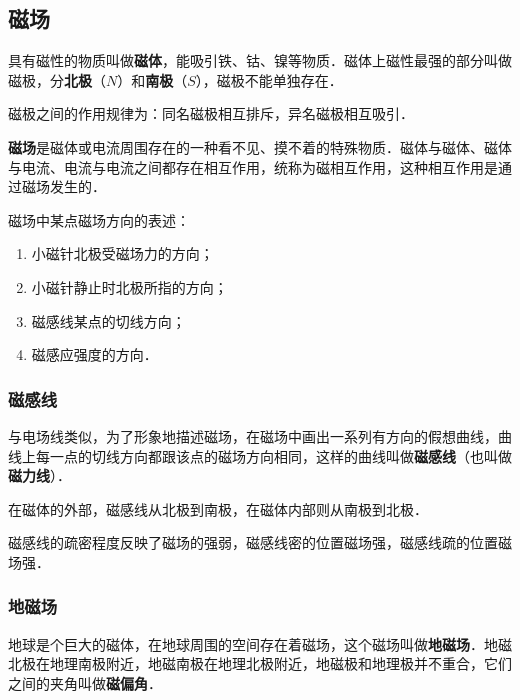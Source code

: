 
\begin{issues}
\issueDraft
\issueTODO
\end{issues}
\subsection{磁场}

具有磁性的物质叫做\textbf{磁体}，能吸引铁、钴、镍等物质．磁体上磁性最强的部分叫做磁极，分\textbf{北极}（$N$）和\textbf{南极}（$S$），磁极不能单独存在．

磁极之间的作用规律为：同名磁极相互排斥，异名磁极相互吸引．

\textbf{磁场}是磁体或电流周围存在的一种看不见、摸不着的特殊物质．磁体与磁体、磁体与电流、电流与电流之间都存在相互作用，统称为磁相互作用，这种相互作用是通过磁场发生的．

磁场中某点磁场方向的表述：

\begin{enumerate}
\item 小磁针北极受磁场力的方向；
\item 小磁针静止时北极所指的方向；
\item 磁感线某点的切线方向；
\item 磁感应强度的方向．
\end{enumerate}

\subsubsection{磁感线}
与电场线类似，为了形象地描述磁场，在磁场中画出一系列有方向的假想曲线，曲线上每一点的切线方向都跟该点的磁场方向相同，这样的曲线叫做\textbf{磁感线}（也叫做\textbf{磁力线}）．

在磁体的外部，磁感线从北极到南极，在磁体内部则从南极到北极．

磁感线的疏密程度反映了磁场的强弱，磁感线密的位置磁场强，磁感线疏的位置磁场强．

\subsubsection{地磁场}

地球是个巨大的磁体，在地球周围的空间存在着磁场，这个磁场叫做\textbf{地磁场}．地磁北极在地理南极附近，地磁南极在地理北极附近，地磁极和地理极并不重合，它们之间的夹角叫做\textbf{磁偏角}．